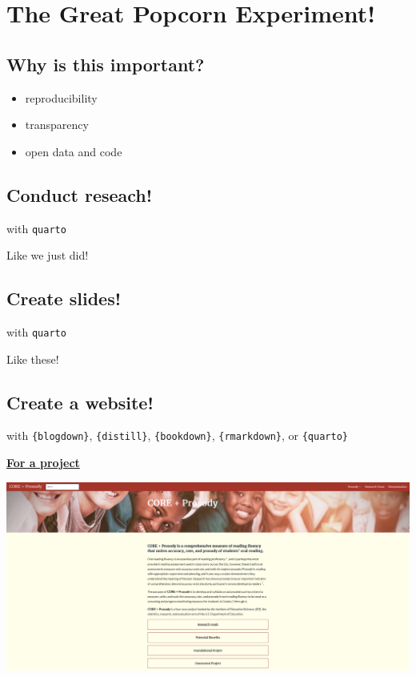 \documentclass[
  letterpaper,
  DIV=11,
  numbers=noendperiod,
  oneside]{scrartcl}
\providecommand{\tightlist}{%
  \setlength{\itemsep}{0pt}\setlength{\parskip}{0pt}}\usepackage{longtable,booktabs,array}
\begin{document}
\hypertarget{the-great-popcorn-experiment}{%
\section{The Great Popcorn
Experiment!}\label{the-great-popcorn-experiment}}

\hypertarget{why-is-this-important}{%
\subsection{Why is this important?}\label{why-is-this-important}}

\begin{itemize}
\tightlist
\item
  reproducibility
\item
  transparency
\item
  open data and code
\end{itemize}

\hypertarget{conduct-reseach}{%
\subsection{Conduct reseach!}\label{conduct-reseach}}

with \texttt{quarto}

Like we just did!

\hypertarget{create-slides}{%
\subsection{Create slides!}\label{create-slides}}

with \texttt{quarto}

Like these!

\hypertarget{create-a-website}{%
\subsection{Create a website!}\label{create-a-website}}

with \texttt{\{blogdown\}}, \texttt{\{distill\}}, \texttt{\{bookdown\}},
\texttt{\{rmarkdown\}}, or \texttt{\{quarto\}}

\href{https://jnese.github.io/coreprosody/}{\textbf{For a project}}

\includegraphics{./images/coreprosody.PNG}
\end{document}
